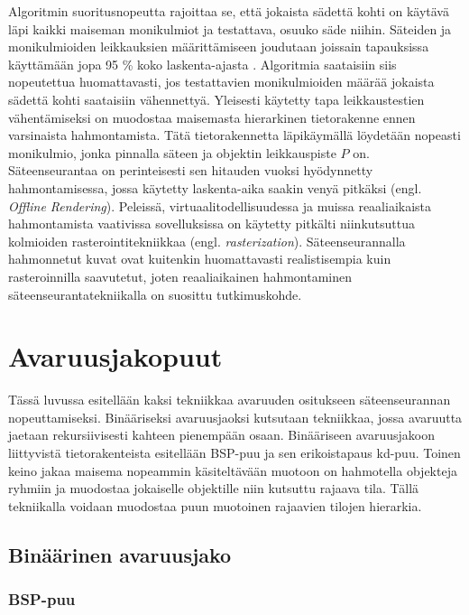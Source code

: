\documentclass[a4paper, 12pt, titlepage]{article}
\begin{document}
Algoritmin suoritusnopeutta rajoittaa se, että jokaista sädettä kohti on käytävä läpi kaikki maiseman monikulmiot ja testattava, osuuko säde niihin. Säteiden ja monikulmioiden leikkauksien määrittämiseen joudutaan joissain tapauksissa käyttämään jopa 95 \% koko laskenta-ajasta \citep{whitted}. Algoritmia saataisiin siis nopeutettua huomattavasti, jos testattavien monikulmioiden määrää jokaista sädettä kohti saataisiin vähennettyä. Yleisesti käytetty tapa leikkaustestien vähentämiseksi on muodostaa maisemasta hierarkinen tietorakenne ennen varsinaista hahmontamista. Tätä tietorakennetta läpikäymällä löydetään nopeasti monikulmio, jonka pinnalla säteen ja objektin leikkauspiste $P$ on. \citep[.]{rubin}\\

Säteenseurantaa on perinteisesti sen hitauden vuoksi hyödynnetty hahmontamisessa, jossa käytetty laskenta-aika saakin venyä pitkäksi (engl. \emph{Offline Rendering}). Peleissä, virtuaalitodellisuudessa ja muissa reaaliaikaista hahmontamista vaativissa sovelluksissa on käytetty pitkälti niinkutsuttua kolmioiden rasterointitekniikkaa (engl. \emph{rasterization}). Säteenseurannalla hahmonnetut kuvat ovat kuitenkin huomattavasti realistisempia kuin rasteroinnilla saavutetut, joten reaaliaikainen hahmontaminen säteenseurantatekniikalla on suosittu tutkimuskohde. \citep[.]{wald04}  


\vspace{-0.5cm}

\newpage
\section{Avaruusjakopuut}

Tässä luvussa esitellään kaksi tekniikkaa avaruuden ositukseen säteenseurannan nopeuttamiseksi. Binääriseksi avaruusjaoksi kutsutaan tekniikkaa, jossa avaruutta jaetaan rekursiivisesti kahteen pienempään osaan. Binääriseen avaruusjakoon liittyvistä tietorakenteista esitellään BSP-puu ja sen erikoistapaus kd-puu. Toinen keino jakaa maisema nopeammin käsiteltävään muotoon on hahmotella objekteja ryhmiin ja muodostaa jokaiselle objektille niin kutsuttu rajaava tila. Tällä tekniikalla voidaan muodostaa puun muotoinen rajaavien tilojen hierarkia. 

\subsection{Binäärinen avaruusjako}
\subsubsection{BSP-puu}
\end{document}
